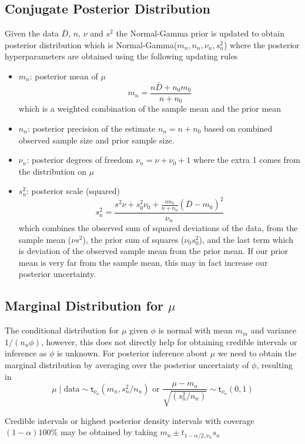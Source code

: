 \documentclass[11pt]{article}
\newcommand{\St}{\textsf{t}}
\def\data{\text{data}}
\begin{document}
\subsection*{Conjugate Posterior Distribution}
Given the data $\bar{D}$, $n$, $\nu$ and $s^2$ the Normal-Gamma prior is updated to obtain posterior distribution which is Normal-Gamma($m_n, n_n, \nu_n, s^2_n$) where the posterior hyperparameters are obtained using the following updating rules
\begin{itemize}
\item $m_n$: posterior mean of $\mu$  
$$m_n = \frac{n \bar{D} + n_0 m_0}{n + n_0}$$
which is a weighted combination of the sample mean and the prior mean
\item $n_n$:  posterior precision of the estimate $n_n = n + n_0$  based on combined observed sample size and prior sample size.
\item $\nu_n$: posterior degrees of freedom $\nu_n = \nu + \nu_0 + 1$ where the extra 1 comes from the distribution on $\mu$
\item $s^2_n$: posterior scale (squared)  
$$ s^2_n = \frac{ s^2 \nu + s^2_0 \nu_0 +  \frac{n n_0} {n + n_0} (\bar{D} - m_0)^2}{\nu_n} $$
which combines the observed sum of squared deviations of the data,  from the sample mean ($\nu s^2$), the prior sum of squares ($\nu_0 s^2_0$), and the last term which is deviation of the observed sample mean from the prior mean. If our   prior mean is very far from the sample mean, this may in fact increase our posterior uncertainty.
\end{itemize}



\subsection*{Marginal Distribution for $\mu$}
The conditional distribution for $\mu$ given $\phi$ is normal with mean $m_m$ and
variance $1/(n_n \phi)$, however, this does not directly help for obtaining credible intervals or inference as $\phi$ is unknown.
For posterior inference about $\mu$ we need to obtain the marginal distribution by
averaging  over the posterior uncertainty of $\phi$, resulting in 
$$
\mu \mid \data  \sim \St_{\nu_n}(m_n, s^2_n/n_n)  \text{ or }  \frac{\mu - m_n}{\sqrt{(s^2_n/n_n)}} \sim \St_{\nu_n}(0,1)
$$

Credible intervals or highest posterior density intervals with coverage $(1 - \alpha) 100\%$ may be obtained by taking 
$m_n \pm t_{1 - \alpha/2, \nu_n} s_n$
\end{document}
